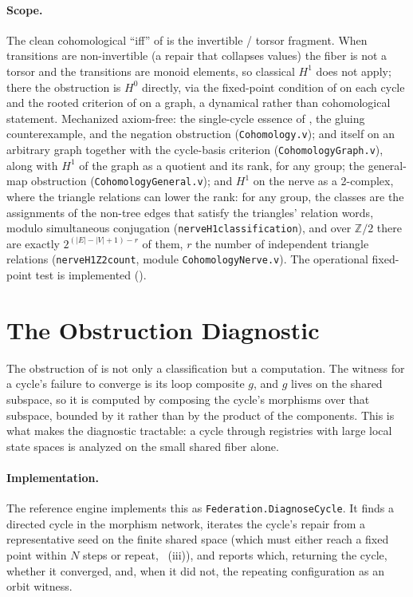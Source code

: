 \documentclass[11pt,a4paper]{article}
\theoremstyle{plain}
\theoremstyle{definition}
\theoremstyle{remark}
\newcommand{\Hz}{H^0}
\newcommand{\Ho}{H^1}
\renewcommand{\_}{\origunderscore\allowbreak}
\begin{document}
\paragraph{Scope.} The clean cohomological ``iff'' of  is the invertible /
torsor fragment. When transitions are non-invertible (a repair that collapses values) the fiber is
not a torsor and the transitions are monoid elements, so classical $\Ho$ does not apply; there the
obstruction is $\Hz$ directly, via the fixed-point condition of  on each cycle
and the rooted criterion of  on a graph, a dynamical rather than cohomological
statement. Mechanized axiom-free: the single-cycle essence of
, the gluing counterexample, and the negation obstruction (\texttt{Cohomology.v});
and  itself on an arbitrary graph together with the cycle-basis criterion
(\texttt{CohomologyGraph.v}), along with $\Ho$ of the graph as a quotient and its rank, for any
group; the general-map obstruction (\texttt{CohomologyGeneral.v}); and $\Ho$ on the nerve as a
2-complex, where the triangle relations can lower the rank: for any group, the classes are the
assignments of the non-tree edges that satisfy the triangles' relation words, modulo simultaneous
conjugation (\texttt{nerve\_H1\_classification}), and over $\mathbb{Z}/2$ there are exactly
$2^{(|E| - |V| + 1) - r}$ of them, $r$ the number of independent triangle relations
(\texttt{nerve\_H1\_Z2\_count}, module \texttt{CohomologyNerve.v}). The operational fixed-point test is implemented ().

\section{The Obstruction Diagnostic}
\label{sec:diagnostic}

The obstruction of  is not only a classification but a computation. The witness
for a cycle's failure to converge is its loop composite $g$, and $g$ lives on the shared subspace, so
it is computed by composing the cycle's morphisms over that subspace, bounded by it rather than by
the product of the components. This is what makes the diagnostic tractable: a cycle through
registries with large local state spaces is analyzed on the small shared fiber alone.

\paragraph{Implementation.} The reference engine implements this as \texttt{Federation.DiagnoseCycle}.
It finds a directed cycle in the morphism network, iterates the cycle's repair from a representative
seed on the finite shared space (which must either reach a fixed point within $N$ steps or repeat,
~(iii)), and reports which, returning the cycle, whether it converged, and, when
it did not, the repeating configuration as an orbit witness.
\end{document}
